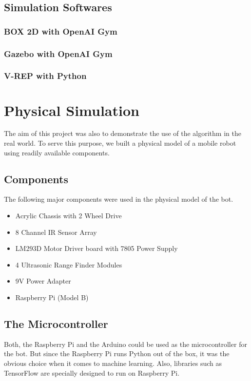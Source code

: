 \documentclass[12pt]{extreport}
\begin{document}
\section{Simulation Softwares}

\subsection{BOX 2D with OpenAI Gym}

\subsection{Gazebo with OpenAI Gym}

\subsection{V-REP with Python}


\chapter{Physical Simulation}


The aim of this project was also to demonstrate the use of the algorithm in the real world. To serve this purpose, we built a physical model of a mobile robot using readily available components.

\section{Components}
The following major components were used in the physical model of the bot.
\begin{itemize}
	\item Acrylic Chassis with 2 Wheel Drive
	\item 8 Channel IR Sensor Array
	\item LM293D Motor Driver board with 7805 Power Supply
	\item 4 Ultrasonic Range Finder Modules
	\item 9V Power Adapter
	\item Raspberry Pi (Model B)
\end{itemize}

\section{The Microcontroller}
Both, the Raspberry Pi and the Arduino could be used as the microcontroller for the bot. But since the Raspberry Pi runs Python out of the box, it was the obvious choice when it comes to machine learning. Also, libraries such as TensorFlow are specially designed to run on Raspberry Pi.
\end{document}
